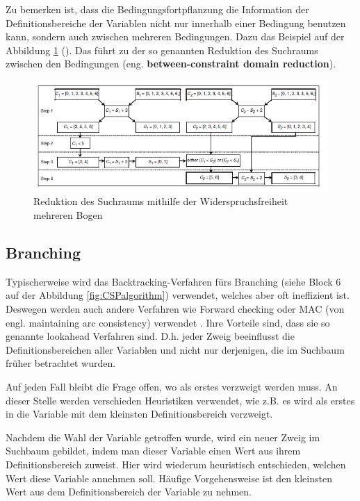 Zu bemerken ist, dass die Bedingungsfortpflanzung die Information der Definitionsbereiche der Variablen nicht nur innerhalb einer Bedingung benutzen kann, sondern auch zwischen mehreren Bedingungen. Dazu das Beispiel auf der Abbildung \ref{fig:ConstraintPropagation2} (\cite{CPforScheduling}). Das führt zu der so genannten Reduktion des Suchraums zwischen den Bedingungen (eng. {\bf between-constraint domain reduction}).

\begin{figure}[h]
	\centering
	\includegraphics[scale=0.8]{fig/ConstraintPropagation2.png}
	\caption{Reduktion des Suchraums mithilfe der Widerspruchsfreiheit mehreren Bogen}
	\label{fig:ConstraintPropagation2}
\end{figure}

\subsection{Branching}

Typischerweise wird das Backtracking-Verfahren fürs Branching (siehe Block $6$ auf der Abbildung \ref{fig:CSPalgorithm}) verwendet, welches aber oft ineffizient ist. Deswegen werden auch andere Verfahren wie Forward checking oder MAC (von engl. maintaining arc consistency) verwendet \citep[vgl.][]{CSP}. Ihre Vorteile sind, dass sie so genannte lookahead Verfahren sind. D.h. jeder Zweig beeinflusst die Definitionsbereichen aller Variablen und nicht nur derjenigen, die im Suchbaum früher betrachtet wurden.

Auf jeden Fall bleibt die Frage offen, wo als erstes verzweigt werden muss. An dieser Stelle werden verschieden Heuristiken verwendet, wie z.B. es wird als erstes in die Variable mit dem kleinsten Definitionsbereich verzweigt.

Nachdem die Wahl der Variable getroffen wurde, wird ein neuer Zweig im Suchbaum gebildet, indem man dieser Variable einen Wert aus ihrem Definitionsbereich zuweist. Hier wird wiederum heuristisch entschieden, welchen Wert diese Variable annehmen soll. Häufige Vorgehensweise ist den kleinsten Wert aus dem Definitionsbereich der Variable zu nehmen.

